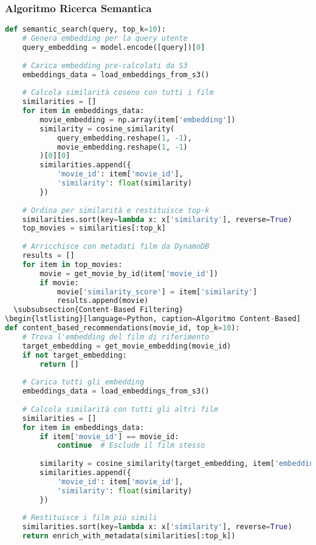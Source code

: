 \documentclass[11pt,a4paper]{article}
\begin{document}
\subsubsection{Algoritmo Ricerca Semantica}
\begin{lstlisting}[language=Python, caption=Implementazione Ricerca Semantica]
def semantic_search(query, top_k=10):
    # Genera embedding per la query utente
    query_embedding = model.encode([query])[0]
    
    # Carica embedding pre-calcolati da S3
    embeddings_data = load_embeddings_from_s3()
    
    # Calcola similarità coseno con tutti i film
    similarities = []
    for item in embeddings_data:
        movie_embedding = np.array(item['embedding'])
        similarity = cosine_similarity(
            query_embedding.reshape(1, -1),
            movie_embedding.reshape(1, -1)
        )[0][0]
        similarities.append({
            'movie_id': item['movie_id'],
            'similarity': float(similarity)
        })
    
    # Ordina per similarità e restituisce top-k
    similarities.sort(key=lambda x: x['similarity'], reverse=True)
    top_movies = similarities[:top_k]
    
    # Arricchisce con metadati film da DynamoDB
    results = []
    for item in top_movies:
        movie = get_movie_by_id(item['movie_id'])
        if movie:
            movie['similarity_score'] = item['similarity']
            results.append(movie)
  \subsubsection{Content-Based Filtering}
\begin{lstlisting}[language=Python, caption=Algoritmo Content-Based]
def content_based_recommendations(movie_id, top_k=10):
    # Trova l'embedding del film di riferimento
    target_embedding = get_movie_embedding(movie_id)
    if not target_embedding:
        return []
    
    # Carica tutti gli embedding
    embeddings_data = load_embeddings_from_s3()
    
    # Calcola similarità con tutti gli altri film
    similarities = []
    for item in embeddings_data:
        if item['movie_id'] == movie_id:
            continue  # Esclude il film stesso
        
        similarity = cosine_similarity(target_embedding, item['embedding'])
        similarities.append({
            'movie_id': item['movie_id'],
            'similarity': float(similarity)
        })
    
    # Restituisce i film più simili
    similarities.sort(key=lambda x: x['similarity'], reverse=True)
    return enrich_with_metadata(similarities[:top_k])
\end{lstlisting}
\end{document}
